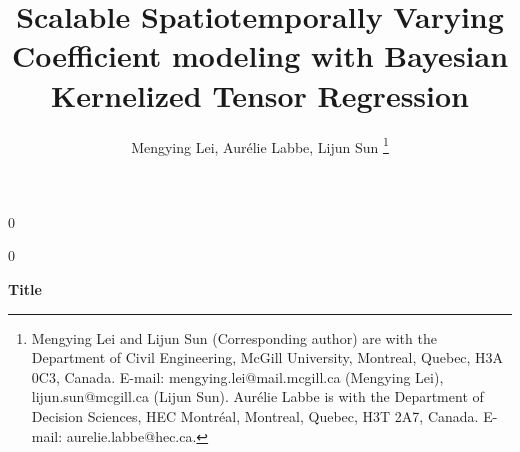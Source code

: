 \documentclass[12pt]{article}
\newcommand{\blind}{0}
\begin{document}
%

\def\spacingset#1{\renewcommand{\baselinestretch}%
{#1}\small\normalsize} \spacingset{1}



\blind
{
  \title{\bf Scalable Spatiotemporally Varying Coefficient modeling with Bayesian Kernelized Tensor Regression}
  \author{Mengying Lei,
        Aur\'elie Labbe,
        Lijun Sun 
    \thanks{Mengying Lei and Lijun Sun (Corresponding author) are with the Department of Civil Engineering, McGill University, Montreal, Quebec, H3A 0C3, Canada. E-mail: mengying.lei@mail.mcgill.ca (Mengying Lei), lijun.sun@mcgill.ca (Lijun Sun). Aur\'elie Labbe is with the Department of Decision Sciences, HEC Montr\'eal, Montreal, Quebec, H3T 2A7, Canada. E-mail: aurelie.labbe@hec.ca.}
    }
  \date{}
  \maketitle
} \fi

\blind
{
  \bigskip
  \bigskip
  \bigskip
  \begin{center}
    {\LARGE\bf Title}
\end{center}
  \medskip
} \fi



\end{document}
